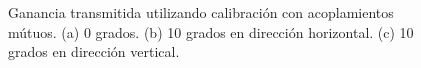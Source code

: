 \begin{figure}[H]
	\centering
 	
		\caption{Ganancia transmitida utilizando calibración con acoplamientos mútuos. (a) 0 grados. (b) 10 grados en 
		dirección horizontal. (c) 10 grados en dirección vertical.}
	\label{fig:chirpErrorMutual}
\end{figure}
